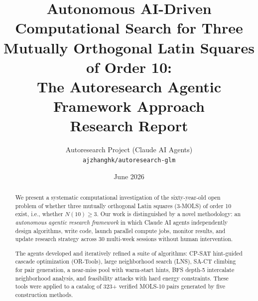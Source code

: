 \documentclass[11pt,a4paper]{article}
\title{\textbf{Autonomous AI-Driven Computational Search for Three\\
Mutually Orthogonal Latin Squares of Order 10:\\
The Autoresearch Agentic Framework Approach}\\[0.5em]
\large Research Report}
\author{Autoresearch Project (Claude AI Agents)\\
\small \texttt{ajzhanghk/autoresearch-glm}}
\date{June 2026}
\theoremstyle{remark}
\begin{document}
\maketitle

\begin{abstract}
We present a systematic computational investigation of the sixty-year-old open problem of
whether three mutually orthogonal Latin squares (3-MOLS) of order 10 exist, i.e., whether
$N(10) \geq 3$. Our work is distinguished by a novel methodology: an \emph{autonomous
agentic research framework} in which Claude AI agents independently design algorithms, write
code, launch parallel compute jobs, monitor results, and update research strategy across 30
multi-week sessions without human intervention.

The agents developed and iteratively refined a suite of algorithms: CP-SAT hint-guided
cascade optimization (OR-Tools), large neighborhood search (LNS), SA-CT climbing for
pair generation, a near-miss pool with warm-start hints, BFS depth-5 intercalate
neighborhood analysis, and feasibility attacks with hard energy constraints. These tools
were applied to a catalog of 323+ verified MOLS-10 pairs generated by five construction
methods.


\end{abstract}
\end{document}
